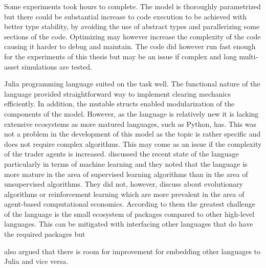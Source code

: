 Some experiments took hours to complete. The model is
thoroughly parametrized but there could be substantial increase
to code execution to be achieved with better type stability,
by avoiding the use of abstract types and parallerizing some
sections of the code. Optimizing may however increase the
complexity of the code causing it harder to debug and maintain. 
The code did however run fast enough for the experiments of this 
thesis but may be an issue if complex and long multi-asset simulations
are tested. 

Julia programming language suited on the task well. The functional nature
of the language provided straightforward way to implement clearing mechanics
efficiently. In addition, the mutable structs enabled modularization of the
components of the model. However, as the language is relatively new it is
lacking extensive ecosystems as more matured languages, such as Python,
has. This was not a problem in the development of this model as the topic is 
rather specific and does not require complex algorithms. This may come as an
issue if the complexity of the trader agents is increased. \citet{JuliaML2020} 
discussed the recent state of the language particularly in terms of machine 
learning and they noted that the language is more mature in the area of
supervised learning algorithms than in the area of unsupervised algorithms.
They did not, however, discuss about evolutionary algorithms or reinforcement
learning which are more prevalent in the area of agent-based computational economics.
According to them the greatest challenge of the language is the small ecosystem
of packages compared to other high-level languages. This can be mitigated
with interfacing other languages that do have the required packages but 
\author{JuliaML2020} also argued that there is room for improvement for embedding
other languages to Julia and vice versa.

